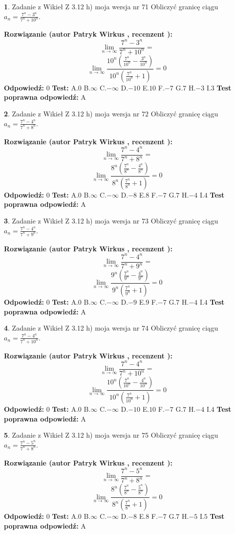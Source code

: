 \documentclass[12pt, a4paper]{article}
\theoremstyle{definition} %
\newtheorem{zad}{}
\newcommand{\zadStart}[1]{\begin{zad}#1\newline}
\newcommand{\zadStop}{\end{zad}}
\newcommand{\rozwStart}[2]{\noindent \textbf{Rozwiązanie (autor #1 , recenzent #2): }\newline}
\newcommand{\rozwStop}{\newline}
\newcommand{\odpStart}{\noindent \textbf{Odpowiedź:}\newline}
\newcommand{\odpStop}{\newline}
\newcommand{\testStart}{\noindent \textbf{Test:}\newline}
\newcommand{\testStop}{\newline}
\newcommand{\kluczStart}{\noindent \textbf{Test poprawna odpowiedź:}\newline}
\newcommand{\kluczStop}{\newline}
\begin{document}
\zadStart{Zadanie z Wikieł Z 3.12 h) moja wersja nr 71}
Obliczyć granicę ciągu $a_{n}=\frac{7^{n} - 3^{n}}{7^{n} + 10^{n}}$.
\zadStop
\rozwStart{Patryk Wirkus}{}
$$\lim\limits_{n\to\infty}\frac{7^{n} - 3^{n}}{7^{n} + 10^{n}}=$$
$$\lim\limits_{n\to\infty}\frac{10^{n}(\frac{7^{n}}{10^{n}} - \frac{3^{n}}{10^{n}})}{10^{n}(\frac{7^{n}}{10^{n}} + 1)} = 0$$
\rozwStop
\odpStart
$0$
\odpStop
\testStart
A.$0$
B.$\infty$
C.$-\infty$
D.$-10$
E.$10$
F.$-7$
G.$7$
H.$-3$
I.$3$
\testStop
\kluczStart
A
\kluczStop



\zadStart{Zadanie z Wikieł Z 3.12 h) moja wersja nr 72}
Obliczyć granicę ciągu $a_{n}=\frac{7^{n} - 4^{n}}{7^{n} + 8^{n}}$.
\zadStop
\rozwStart{Patryk Wirkus}{}
$$\lim\limits_{n\to\infty}\frac{7^{n} - 4^{n}}{7^{n} + 8^{n}}=$$
$$\lim\limits_{n\to\infty}\frac{8^{n}(\frac{7^{n}}{8^{n}} - \frac{4^{n}}{8^{n}})}{8^{n}(\frac{7^{n}}{8^{n}} + 1)} = 0$$
\rozwStop
\odpStart
$0$
\odpStop
\testStart
A.$0$
B.$\infty$
C.$-\infty$
D.$-8$
E.$8$
F.$-7$
G.$7$
H.$-4$
I.$4$
\testStop
\kluczStart
A
\kluczStop



\zadStart{Zadanie z Wikieł Z 3.12 h) moja wersja nr 73}
Obliczyć granicę ciągu $a_{n}=\frac{7^{n} - 4^{n}}{7^{n} + 9^{n}}$.
\zadStop
\rozwStart{Patryk Wirkus}{}
$$\lim\limits_{n\to\infty}\frac{7^{n} - 4^{n}}{7^{n} + 9^{n}}=$$
$$\lim\limits_{n\to\infty}\frac{9^{n}(\frac{7^{n}}{9^{n}} - \frac{4^{n}}{9^{n}})}{9^{n}(\frac{7^{n}}{9^{n}} + 1)} = 0$$
\rozwStop
\odpStart
$0$
\odpStop
\testStart
A.$0$
B.$\infty$
C.$-\infty$
D.$-9$
E.$9$
F.$-7$
G.$7$
H.$-4$
I.$4$
\testStop
\kluczStart
A
\kluczStop



\zadStart{Zadanie z Wikieł Z 3.12 h) moja wersja nr 74}
Obliczyć granicę ciągu $a_{n}=\frac{7^{n} - 4^{n}}{7^{n} + 10^{n}}$.
\zadStop
\rozwStart{Patryk Wirkus}{}
$$\lim\limits_{n\to\infty}\frac{7^{n} - 4^{n}}{7^{n} + 10^{n}}=$$
$$\lim\limits_{n\to\infty}\frac{10^{n}(\frac{7^{n}}{10^{n}} - \frac{4^{n}}{10^{n}})}{10^{n}(\frac{7^{n}}{10^{n}} + 1)} = 0$$
\rozwStop
\odpStart
$0$
\odpStop
\testStart
A.$0$
B.$\infty$
C.$-\infty$
D.$-10$
E.$10$
F.$-7$
G.$7$
H.$-4$
I.$4$
\testStop
\kluczStart
A
\kluczStop



\zadStart{Zadanie z Wikieł Z 3.12 h) moja wersja nr 75}
Obliczyć granicę ciągu $a_{n}=\frac{7^{n} - 5^{n}}{7^{n} + 8^{n}}$.
\zadStop
\rozwStart{Patryk Wirkus}{}
$$\lim\limits_{n\to\infty}\frac{7^{n} - 5^{n}}{7^{n} + 8^{n}}=$$
$$\lim\limits_{n\to\infty}\frac{8^{n}(\frac{7^{n}}{8^{n}} - \frac{5^{n}}{8^{n}})}{8^{n}(\frac{7^{n}}{8^{n}} + 1)} = 0$$
\rozwStop
\odpStart
$0$
\odpStop
\testStart
A.$0$
B.$\infty$
C.$-\infty$
D.$-8$
E.$8$
F.$-7$
G.$7$
H.$-5$
I.$5$
\testStop
\kluczStart
A
\kluczStop
\end{document}
